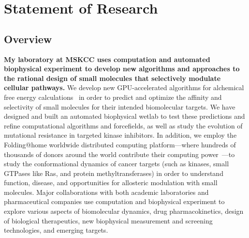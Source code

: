 \documentclass[10pt]{article}
\renewcommand{\baselinestretch}{1.1}
\begin{document}

\setlength{\oddsidemargin}{0pt}
\setlength{\evensidemargin}{0pt}
\setlength{\marginparwidth}{0pt}
\setlength{\textwidth}{7.5in}
\setlength{\marginparsep}{0pt}
 \fancyfootoffset{-0.5in}

\renewcommand{\baselinestretch}{1.0}
\setlength{\parskip}{0.25em}

\section*{Statement of Research}

\subsection*{Overview}

{\bf My laboratory at MSKCC uses computation and automated biophysical experiment to develop new algorithms and approaches to the rational design of small molecules that selectively modulate cellular pathways.}
We develop new GPU-accelerated algorithms for alchemical free energy calculations~\cite{tembe-mccammon:comput-chem:1984:alchemical-free-energy-calculations,shirts-mobley-chodera:2007:annu-rep-comput-chem:prime-time,chodera:curr-opin-struct-biol:2011:drug-discovery,wang:jcamd:2013:yank} in order to predict and optimize the affinity and selectivity of small molecules for their intended biomolecular targets.
We have designed and built an automated biophysical wetlab to test these predictions and refine computational algorithms and forcefields, as well as study the evolution of mutational resistance in targeted kinase inhibitors.
In addition, we employ the Folding@home worldwide distributed computing platform---where hundreds of thousands of donors around the world contribute their computing power~\cite{shirts-pande:science:2000:folding-at-home,folding-at-home-stats}---to study the conformational dynamics of cancer targets (such as kinases, small GTPases like Ras, and protein methyltransferases) in order to understand function, disease, and opportunities for allosteric modulation with small molecules.
Major collaborations with both academic laboratories and pharmaceutical companies use computation and biophysical experiment to explore various aspects of biomolecular dynamics, drug pharmacokinetics, design of biological therapeutics, new biophysical measurement and screening technologies, and emerging targets.
\end{document}
